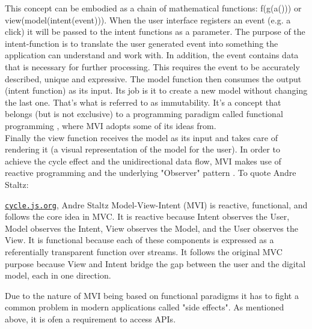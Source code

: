 This concept can be embodied as a chain of mathematical functions: f(g(a())) or view(model(intent(event))).
When the user interface registers an event (e.g. a click) it will be passed to the intent functions as a parameter. 
The purpose of the intent-function is to translate the user generated event into something the application can understand and work with.
In addition, the event contains data that is necessary for further processing. This requires the event to be accurately described, unique and expressive.
The model function then consumes the output (intent function) as its input. Its job is it to create a new model without changing the last one. 
That's what is referred to as immutability. 
\cite{immutabilityEffectiveJavaJoshuaBloch2017,immutabilityImmutableObjectsInJavaChristianHaack2006}
It's a concept that belongs (but is not exclusive) to a programming paradigm called functional programming
\cite{functionalProgrammingFunctionalProgrammingInJavaPierreYves2017},
where MVI adopts some of its ideas from.
\\
Finally the view function receives the model as its input and takes care of rendering it (a visual representation of the model for the user). 
In order to achieve the cycle effect and the unidirectional data flow, MVI makes use of reactive programming 
\cite{reactiveProgrammingReactiveProgrammingWithJavaBenChristensen,reactiveProgrammingTheIntroductionToReactiveAndreStaltz} 
and the underlying "Observer" pattern 
\cite{wikipediaObserverPattern}.
To quote Andre Staltz:
\begin{pquotation}{\href{https://cycle.js.org/model-view-intent.html#model-view-intent-what-mvc-is-really-about}{\nolinkurl{cycle.js.org}}, Andre Staltz}
    Model-View-Intent (MVI) is reactive, functional, and follows the core idea in MVC. It is reactive because Intent observes the User, Model observes the Intent, 
    View observes the Model, and the User observes the View. It is functional because each of these components is expressed as a referentially transparent function 
    over streams. It follows the original MVC purpose because View and Intent bridge the gap between the user and the digital model, each in one direction.
\end{pquotation}
Due to the nature of MVI being based on functional paradigms it has to fight a common problem in modern applications called "side effects".
As mentioned above, it is ofen a requirement to access APIs.


